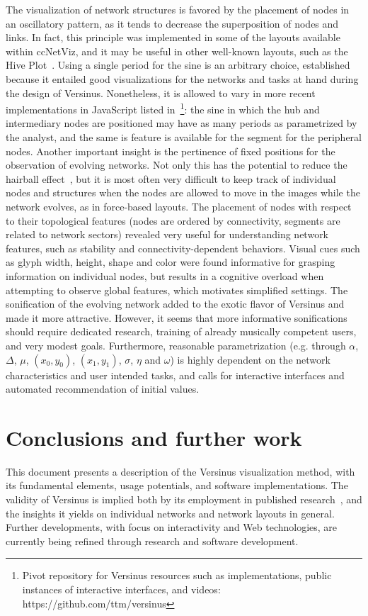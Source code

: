 \documentclass[runningheads]{llncs}
\begin{document}
The visualization of network structures is favored by the placement of nodes in an oscillatory pattern, as it tends to decrease the superposition of nodes and links. In fact, this principle was implemented in some of the layouts available within ccNetViz, and it may be useful in other well-known layouts, such as the Hive Plot~\cite{hive}.
Using a single period for the sine is an arbitrary choice, established because it entailed good visualizations for the networks and tasks at hand during the design of Versinus. Nonetheless, it is allowed to vary in more recent implementations in JavaScript listed in~\footnote{Pivot repository for Versinus resources such as implementations, public instances of interactive interfaces, and videos: https://github.com/ttm/versinus}: the sine in which the hub and intermediary nodes are positioned may have as many periods as parametrized by the analyst, and the same is feature is available for the segment for the peripheral nodes.
Another important insight is the pertinence of fixed positions for the observation of evolving networks.
Not only this has the potential to reduce the hairball effect~\cite{hairball},
but it is most often very difficult to keep track of individual nodes and structures when the nodes are allowed to move in the images while the network evolves, as in force-based layouts.
The placement of nodes with respect to their topological features (nodes are ordered by connectivity,
segments are related to network sectors) revealed very useful for understanding network features,
such as stability and connectivity-dependent behaviors.
Visual cues such as glyph width, height, shape and color were found informative for grasping information on individual nodes,
but results in a cognitive overload when attempting to observe global features,
which motivates simplified settings.
The sonification of the evolving network added to the exotic flavor of Versinus and made it more attractive.
However, it seems that more informative sonifications should require dedicated research,
training of already musically competent users, and very modest goals. 
Furthermore, reasonable parametrization (e.g. through $\alpha$, $\Delta$, $\mu$, $(x_0, y_0)$, $(x_1, y_1)$, $\sigma$, $\eta$ and $\omega$) is highly dependent on the network characteristics and user intended tasks, and calls for interactive interfaces and automated recommendation of initial values.

\section{Conclusions and further work}\label{sec:con}
This document presents a description of the Versinus visualization method, with its fundamental elements, usage potentials, and software implementations.
The validity of Versinus is implied both by its employment in published research~\cite{stab,thesis}, and the insights it yields on individual networks and network
layouts in general.
Further developments,
with focus on interactivity and Web technologies,
are currently being refined
through research and software development.
\end{document}
